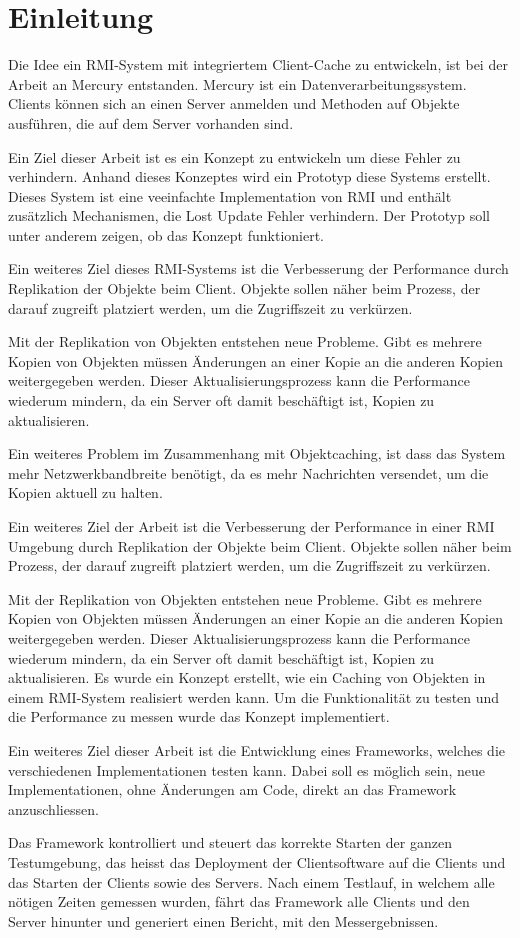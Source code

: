 \chapter{Einleitung}

Die Idee ein RMI-System mit integriertem Client-Cache zu entwickeln, ist bei der Arbeit an Mercury entstanden. Mercury ist ein Datenverarbeitungssystem. Clients können sich an einen Server anmelden und Methoden auf Objekte ausführen, die auf dem Server vorhanden sind. 

Ein Ziel dieser Arbeit ist es ein Konzept zu entwickeln um
diese Fehler zu verhindern. Anhand dieses Konzeptes wird ein Prototyp
diese Systems erstellt. Dieses System ist eine veeinfachte
Implementation von RMI und enthält zusätzlich Mechanismen, die Lost
Update Fehler verhindern. Der Prototyp soll unter anderem zeigen, ob
das Konzept funktioniert. 

Ein weiteres Ziel dieses RMI-Systems ist die Verbesserung der Performance durch Replikation der Objekte beim Client. Objekte sollen näher beim Prozess, der darauf zugreift platziert werden, um die Zugriffszeit zu verkürzen.

Mit der Replikation von Objekten entstehen neue Probleme. Gibt es mehrere Kopien von Objekten müssen Änderungen an einer Kopie an die anderen Kopien weitergegeben werden. Dieser Aktualisierungsprozess kann die Performance wiederum mindern, da ein Server oft damit beschäftigt ist, Kopien zu aktualisieren.

Ein weiteres Problem im Zusammenhang mit Objektcaching, ist dass das System mehr Netzwerkbandbreite benötigt, da es mehr Nachrichten versendet, um die Kopien aktuell zu halten.

Ein weiteres Ziel der Arbeit ist die Verbesserung der Performance in einer RMI Umgebung durch Replikation der Objekte beim Client. Objekte sollen näher beim Prozess, der darauf zugreift platziert werden, um die Zugriffszeit zu verkürzen.

Mit der Replikation von Objekten entstehen neue Probleme. Gibt es mehrere Kopien von Objekten müssen Änderungen an einer Kopie an die anderen Kopien weitergegeben werden. Dieser Aktualisierungsprozess kann die Performance wiederum mindern, da ein Server oft damit beschäftigt ist, Kopien zu aktualisieren. Es wurde ein Konzept erstellt, wie ein Caching von Objekten in einem RMI-System realisiert werden kann. Um die Funktionalität zu testen und die Performance zu messen wurde das Konzept implementiert. 

Ein weiteres Ziel dieser Arbeit ist die Entwicklung eines Frameworks, welches die verschiedenen Implementationen testen kann. Dabei soll es möglich sein, neue Implementationen, ohne Änderungen am Code, direkt an das Framework anzuschliessen. 

Das Framework kontrolliert und steuert das korrekte Starten der ganzen Testumgebung, das heisst das Deployment der Clientsoftware auf die Clients und das Starten der Clients sowie des Servers. Nach einem Testlauf, in welchem alle nötigen Zeiten gemessen wurden, fährt das Framework alle Clients und den Server hinunter und generiert einen Bericht, mit den Messergebnissen.
